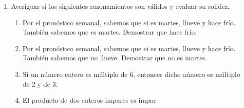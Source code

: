 \documentclass[a4paper]{article}
\newcommand{\exercise}{\item}
\newcommand{\then}{\to}
\newcommand{\eq}{\leftrightarrow}
\newcommand{\xor}{\veebar}
\begin{document}
\begin{enumerate}
\begin{enumerate} [label=(\alph*)]
		\item Dado que la proposición $(p\lor \neg q) \eq  (r\then s)$ es F  y $r$ es F, hallar el valor de $p$ y de $q$. 
		\item Dado que la proposición $\neg (p\land q) \xor  (r\lor s)$ es V  y $r$ es V, hallar el valor de $p$ y de $q$. 
		\item Dado que la proposición $(p\xor q) \land  \neg (r\lor s)$ es V  y $p$ es V, hallar el valor de $q$, $r$ y $s$. 
		\item Dado que la proposición $(p\lor r) \xor  (q\land p \eq r)$ es F  y $r$ es V, hallar el valor de $p$ y de $q$. 
		\item $r$ es F. Averiguar el valor de $((r \then q) \xor \neg r) \land p$.
		\item $p$ es V. Averiguar el valor de $((r \land \neg p) \land (q \lor p)) \then r$.
		\item $(p \then q) \lor \neg r$ es F. Averiguar el valor de $p$, $q$ y $r$.
		\item $(p \land \neg q) \then \neg (r \then \neg s)$ es F. Averiguar el valor de $p$, $q$, $r$ y $s$.
		\item $((p \then q) \eq t) \lor (p \then t)$ es F. Averiguar el valor de $p$, $q$ y $t$.
		\item $((s \then p) \then (p \eq q)) \lor (p \land r)$ es F y $s$ es V. Averiguar el valor de $p$, $q$ y $r$.
		\item $\neg \left( (p \then q) \to s(s \then r)\right)$ es V. Averiguar el valor de $(\neg q \then \neg p) \xor (r \then s)$ y de $(\neg p \lor q) \land (s \land \neg r)$
		\item $\left(((p \xor q) \land r) \then (s \eq r) \right) \lor \left((q \then p) \then (\neg s \land t)\right)$ es F. Averiguar el valor de $p \then q$, de $r \xor s$ y de $(p \lor q) \then (\neg s \xor t)$
	\end{enumerate}
	\exercise Averiguar si los siguientes razonamientos son válidos y evaluar su solidez.
	\begin{enumerate} [label=(\alph*)]
		\item Por el pronóstico semanal, sabemos que si es martes, llueve y hace frío. También sabemos que es martes. Demostrar que hace frío.
		\item Por el pronóstico semanal, sabemos que si es martes, llueve y hace frío. También sabemos que no llueve. Demostrar que no es martes.
		\item Si un número entero es múltiplo de 6, entonces dicho número es múltiplo de 2 y de 3.
		\item El producto de dos enteros impares es impar

\end{enumerate}
\end{enumerate}
\end{document}
